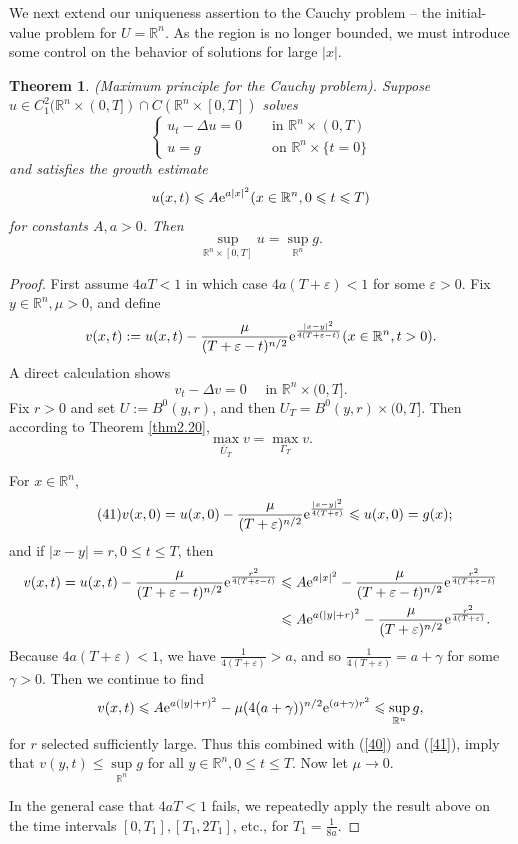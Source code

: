 \documentclass[hyperref,UTF8,12pt]{article}
\numberwithin{equation}{subsection}
\theoremstyle{plain}
\newtheorem{theorem}{Theorem}
\theoremstyle{definition}
\numberwithin{theorem}{section}
\numberwithin{lemma}{section}
\numberwithin{proposition}{section}
\numberwithin{remark}{section}
\numberwithin{corollary}{section}
\numberwithin{definition}{section}
\numberwithin{problem}{section}
\numberwithin{example}{section}
\def\e{\textup{e}}
\newcommand{\mr}{\mathbb{R}}
\renewcommand{\leq}{\leqslant}
\newcommand{\ve}{\varepsilon}
\begin{document}
We next extend our uniqueness assertion to the Cauchy problem -- the initial-value problem for $U=\mr^n$. As the region is no longer bounded, we must introduce some control on the behavior of solutions for large $|x|$.
\begin{theorem}\label{thm2.22}
(Maximum principle for the Cauchy problem). Suppose $u\in C_1^2(\mr^n\times(0,T])\cap C(\mr^n\times[0,T])$ solves\[\left\{\begin{aligned}
	u_t-\Delta u=0&\quad\text{ in } \mr^n\times(0,T)\\
	u=g&\quad\text{ on }\mr^n\times\{t=0\}
\end{aligned}\right.\]
and satisfies the growth estimate\[u(x,t)\leq A\e^{a|x|^2}(x\in\mr^n,0\leq t\leq T)\]
for constants $A, a>0$. Then\[\sup_{\mr^n\times[0,T]}u=\sup_{\mr^n}g.\]
\end{theorem}
\begin{proof}
First assume $4aT<1$ in which case $4a(T+\ve)<1$ for some $\ve>0$. Fix $y\in\mr^n,\mu> 0$, and define\[v(x,t):=u(x,t)-\frac{\mu}{(T+\ve-t)^{n/2}}\e^{\frac{|x-y|^2} {4(T+\ve-t)}}(x\in\mr^n,t>0).\]A direct calculation shows
\[v_t-\Delta v=0\quad\text{ in } \mr^n\times(0,T].\]Fix $r>0$ and set $U:=B^0(y,r)$, and then $U_T=B^0(y,r)\times(0,T]$. Then according to Theorem \ref{thm2.20},\[\tag{40}
\max_{\bar{U}_T}v=\max_{\Gamma_T}v.\label{40}\]

For $x\in\mr^n$,\[\tag{41}v(x,0)=u(x,0)-\frac{\mu}{(T+\ve)^{n/2}}\e^{\frac{|x-y|^2} {4(T+\ve)}}\leq u(x,0)=g(x);\label{41}\]and if $|x-y|=r, 0 \leq t \leq T$, then
\[\begin{aligned}
	v(x,t)=u(x,t)-\frac{\mu}{(T+\ve-t)^{n/2}}\e^{\frac{r^2}{4(T+\ve-t)}}&\leq A\e^{a|x|^2}-\frac{\mu}{(T+\ve-t)^{n/2}}\e^{\frac{r^2}{4(T+\ve-t)}}\\
	&\leq A\e^{a(|y|+r)^2}-\frac{\mu}{(T+\ve)^{n/2}}\e^{\frac{r^2}{4(T+\ve)}}.
\end{aligned}\]Because $4a(T+\ve)<1$, we have $\frac{1}{4(T+\ve)}>a$, and so $\frac{1}{4(T+\ve)}=a+\gamma$ for some $\gamma>0$. Then we continue to find\[v(x,t)
\leq A\e^{a(|y|+r)^2}-\mu(4(a+\gamma))^{n/2}\e^{(a+\gamma)r^2}\leq\sup_{\mr^n}g,\] for $r$ selected sufficiently large. Thus this combined with (\ref{40}) and (\ref{41}), imply that $v(y,t)\leq\sup\limits_{\mr^n}g$ for all $y\in\mr^n,0\leq t\leq T$. Now let $\mu\to0$.

In the general case that $4aT<1$ fails, we repeatedly apply the result above on the time intervals $[0,T_1],[T_1,2T_1]$, etc., for $T_1=\frac{1}{8a}$.
\end{proof}
\end{document}
